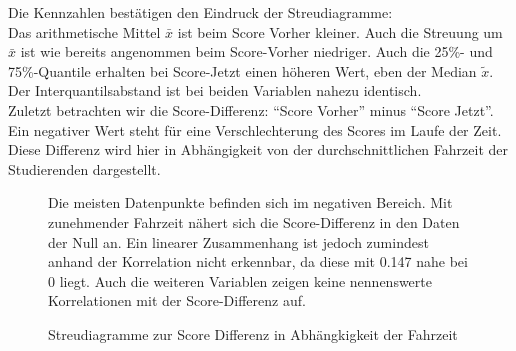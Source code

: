 \documentclass[11pt, a4paper]{article}
\begin{document}
	Die Kennzahlen bestätigen den Eindruck der Streudiagramme:\\
Das arithmetische Mittel $\bar{x}$ ist beim Score Vorher kleiner.
Auch die Streuung um $\bar{x}$ ist wie bereits angenommen beim Score-Vorher niedriger. Auch die 25\%- und 75\%-Quantile erhalten bei Score-Jetzt einen höheren Wert, eben der Median $\tilde{x}$.
Der Interquantilsabstand ist bei beiden Variablen nahezu identisch. \\
Zuletzt betrachten wir die Score-Differenz: “Score Vorher” minus “Score Jetzt”. 
Ein negativer Wert steht für eine Verschlechterung des Scores im Laufe der Zeit.
Diese Differenz wird hier in Abhängigkeit von der durchschnittlichen Fahrzeit der Studierenden dargestellt.

	
\begin{figure}[h]
	{\centering 
		\vspace{-0.5cm}
		\caption{ Streudiagramme zur Score Differenz in Abhängkigkeit der Fahrzeit }}
		\vspace{1cm}
		
	Die meisten Datenpunkte befinden sich im negativen Bereich. Mit zunehmender Fahrzeit nähert sich die Score-Differenz in den Daten der Null an. Ein linearer Zusammenhang ist jedoch zumindest anhand der Korrelation nicht erkennbar, da diese mit 0.147 nahe bei 0 liegt. Auch die weiteren Variablen zeigen keine nennenswerte Korrelationen mit der Score-Differenz auf.
		
		
\end{figure}



\newpage
\end{document}
